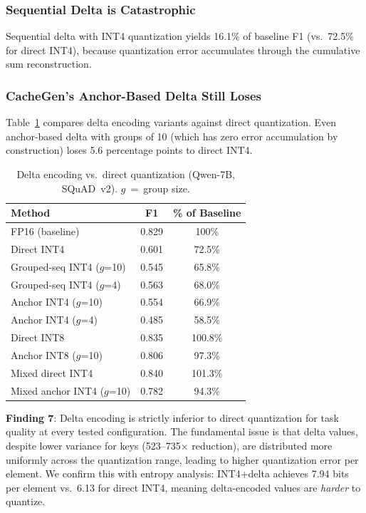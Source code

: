 \documentclass[conference]{IEEEtran}
\begin{document}
\subsubsection{Sequential Delta is Catastrophic}

Sequential delta with INT4 quantization yields 16.1\% of baseline F1 (vs.\ 72.5\% for direct INT4), because quantization error accumulates through the cumulative sum reconstruction.

\subsubsection{CacheGen's Anchor-Based Delta Still Loses}

Table~\ref{tab:delta} compares delta encoding variants against direct quantization.
Even anchor-based delta with groups of 10 (which has zero error accumulation by construction) loses 5.6 percentage points to direct INT4.

\begin{table}[t]
\centering
\caption{Delta encoding vs.\ direct quantization (Qwen-7B, SQuAD~v2). $g$~=~group size.}
\label{tab:delta}
\small
\begin{tabular}{@{}lcc@{}}
\toprule
\textbf{Method} & \textbf{F1} & \textbf{\% of Baseline} \\
\midrule
FP16 (baseline)         & 0.829 & 100\% \\
\midrule
Direct INT4             & 0.601 & 72.5\% \\
Grouped-seq INT4 ($g$=10) & 0.545 & 65.8\% \\
Grouped-seq INT4 ($g$=4)  & 0.563 & 68.0\% \\
Anchor INT4 ($g$=10)      & 0.554 & 66.9\% \\
Anchor INT4 ($g$=4)       & 0.485 & 58.5\% \\
\midrule
Direct INT8             & 0.835 & 100.8\% \\
Anchor INT8 ($g$=10)    & 0.806 & 97.3\% \\
\midrule
Mixed direct INT4       & 0.840 & 101.3\% \\
Mixed anchor INT4 ($g$=10) & 0.782 & 94.3\% \\
\bottomrule
\end{tabular}
\end{table}

\textbf{Finding 7}: Delta encoding is strictly inferior to direct quantization for task quality at every tested configuration.
The fundamental issue is that delta values, despite lower variance for keys (523--735$\times$ reduction), are distributed more uniformly across the quantization range, leading to higher quantization error per element.
We confirm this with entropy analysis: INT4+delta achieves 7.94 bits per element vs.\ 6.13 for direct INT4, meaning delta-encoded values are \emph{harder} to quantize.
\end{document}
